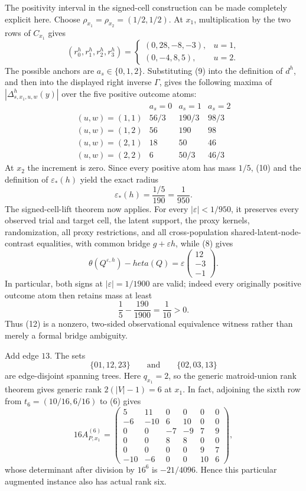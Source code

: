 The positivity interval in the signed-cell construction can be made completely explicit here.  Choose \(\rho_{x_1}=\rho_{x_2}=(1/2,1/2)\).  At \(x_1\), multiplication by the two rows of \(C_{x_1}\) gives
\[
(r^h_0,r^h_1,r^h_2,r^h_3)
=\begin{cases}
(0,28,-8,-3),&u=1,\\
(0,-4,8,5),&u=2.
\end{cases}
\tag{9}
\]
The possible anchors are \(a_s\in\{0,1,2\}\).  Substituting (9) into the definition of \(d^h\), and then into the displayed right inverse \(\Gamma\), gives the following maxima of \(|\Delta^h_{s,x_1,u,w}(y)|\) over the five positive outcome atoms:
\[
\begin{array}{c|ccc}
&a_s=0&a_s=1&a_s=2\\ \hline
(u,w)=(1,1)&56/3&190/3&98/3\\
(u,w)=(1,2)&56&190&98\\
(u,w)=(2,1)&18&50&46\\
(u,w)=(2,2)&6&50/3&46/3
\end{array}
\tag{10}
\]
At \(x_2\) the increment is zero.  Since every positive atom has mass \(1/5\), (10) and the definition of \(\varepsilon_*(h)\) yield the exact radius
\[
\varepsilon_*(h)=\frac{1/5}{190}=\frac1{950}.
\tag{11}
\]
The signed-cell-lift theorem now applies.  For every \(|\varepsilon|<1/950\), it preserves every observed trial and target cell, the latent support, the proxy kernels, randomization, all proxy restrictions, and all cross-population shared-latent-node-contrast equalities, with common bridge \(g+\varepsilon h\), while (8) gives
\[
\theta(Q^{\varepsilon,h})-	heta(Q)
=\varepsilon\begin{pmatrix}12\\-3\\-1\end{pmatrix}.
\tag{12}
\]
In particular, both signs at \(|\varepsilon|=1/1900\) are valid; indeed every originally positive outcome atom then retains mass at least
\[
\frac15-\frac{190}{1900}=\frac1{10}>0.
\]
Thus (12) is a nonzero, two-sided observational equivalence witness rather than merely a formal bridge ambiguity.

Add edge \(13\).  The sets
\[
\{01,12,23\}\qquad\text{and}\qquad\{02,03,13\}
\]
are edge-disjoint spanning trees.  Here \(q_{x_1}=2\), so the generic matroid-union rank theorem gives generic rank \(2(|V|-1)=6\) at \(x_1\).  In fact, adjoining the sixth row from \(t_6=(10/16,6/16)\) to (6) gives
\[
16A_{P,x_1}^{(6)}=
\begin{pmatrix}
5&11&0&0&0&0\\
-6&-10&6&10&0&0\\
0&0&-7&-9&7&9\\
0&0&8&8&0&0\\
0&0&0&0&9&7\\
-10&-6&0&0&10&6
\end{pmatrix},
\]
whose determinant after division by \(16^6\) is \(-21/4096\).  Hence this particular augmented instance also has actual rank six.

